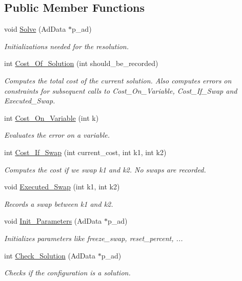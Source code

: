 \subsection*{\-Public \-Member \-Functions}
\begin{DoxyCompactItemize}
\item 
void \hyperlink{classMagicSquare_a3d43d7fa15f945e20491ec1125bd0d44}{\-Solve} (\-Ad\-Data $\ast$p\-\_\-ad)
\begin{DoxyCompactList}\small\item\em \-Initializations needed for the resolution. \end{DoxyCompactList}\item 
int \hyperlink{classMagicSquare_a7e45a2e9c128850bfb6717613a014fff}{\-Cost\-\_\-\-Of\-\_\-\-Solution} (int should\-\_\-be\-\_\-recorded)
\begin{DoxyCompactList}\small\item\em \-Computes the total cost of the current solution. \-Also computes errors on constraints for subsequent calls to \-Cost\-\_\-\-On\-\_\-\-Variable, \-Cost\-\_\-\-If\-\_\-\-Swap and \-Executed\-\_\-\-Swap. \end{DoxyCompactList}\item 
int \hyperlink{classMagicSquare_ae7ededec4689d278c83dc833c3a4b248}{\-Cost\-\_\-\-On\-\_\-\-Variable} (int k)
\begin{DoxyCompactList}\small\item\em \-Evaluates the error on a variable. \end{DoxyCompactList}\item 
int \hyperlink{classMagicSquare_a349868bc563431930a695795e8de84ed}{\-Cost\-\_\-\-If\-\_\-\-Swap} (int current\-\_\-cost, int k1, int k2)
\begin{DoxyCompactList}\small\item\em \-Computes the cost if we swap k1 and k2. \-No swaps are recorded. \end{DoxyCompactList}\item 
void \hyperlink{classMagicSquare_a4764e5e4485406f07f09c13307780757}{\-Executed\-\_\-\-Swap} (int k1, int k2)
\begin{DoxyCompactList}\small\item\em \-Records a swap between k1 and k2. \end{DoxyCompactList}\item 
void \hyperlink{classMagicSquare_a21aa228edea478e4240fb3c27024f670}{\-Init\-\_\-\-Parameters} (\-Ad\-Data $\ast$p\-\_\-ad)
\begin{DoxyCompactList}\small\item\em \-Initializes parameters like freeze\-\_\-swap, reset\-\_\-percent, ... \end{DoxyCompactList}\item 
int \hyperlink{classMagicSquare_a23b9fe6d1e267d66847e8bcb2b575738}{\-Check\-\_\-\-Solution} (\-Ad\-Data $\ast$p\-\_\-ad)
\begin{DoxyCompactList}\small\item\em \-Checks if the configuration is a solution. \end{DoxyCompactList}\end{DoxyCompactItemize}
